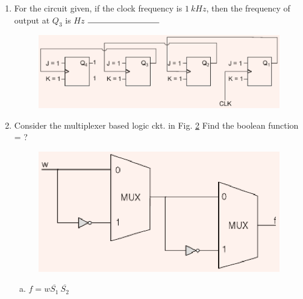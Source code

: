 \documentclass[journal,12pt,twocolumn]{IEEEtran}
\begin{document}
\begin{enumerate}
\begin{figure}
\end{figure} 


\item For the circuit given, if the clock frequency is $1 \ kHz$, then the frequency of output at $Q_3$ is $Hz$ $ \rule{3cm}{0.15mm}$


\begin{figure}

\centering

\includegraphics[width=\columnwidth]{./figs/55.eps}

\caption{}

\label{fig:49}

\end{figure} 


\item Consider the multiplexer based logic ckt. in Fig. \ref{fig:50} Find the boolean function = ?

\begin{figure}

\centering

\includegraphics[width=\columnwidth]{./figs/56.eps}

\caption{}

\label{fig:50}

\end{figure} 



\begin{enumerate}[(a)]

\item $ f = w \overline{S_1} \ \overline{S_2} $


\end{enumerate}
\end{enumerate}
\end{document}
